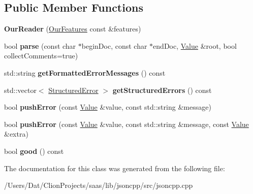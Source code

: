 \subsection*{Public Member Functions}
\begin{DoxyCompactItemize}
\item 
{\bfseries Our\+Reader} (\hyperlink{class_json_1_1_our_features}{Our\+Features} const \&features)\hypertarget{class_json_1_1_our_reader_a48a850914b9c8d7781be172930c478e5}{}\label{class_json_1_1_our_reader_a48a850914b9c8d7781be172930c478e5}

\item 
bool {\bfseries parse} (const char $\ast$begin\+Doc, const char $\ast$end\+Doc, \hyperlink{class_json_1_1_value}{Value} \&root, bool collect\+Comments=true)\hypertarget{class_json_1_1_our_reader_aba4f8749aab7f02ec17f107e392caf80}{}\label{class_json_1_1_our_reader_aba4f8749aab7f02ec17f107e392caf80}

\item 
std\+::string {\bfseries get\+Formatted\+Error\+Messages} () const \hypertarget{class_json_1_1_our_reader_ae9cbb7dbd9c6c96be37432e8dfa1afcb}{}\label{class_json_1_1_our_reader_ae9cbb7dbd9c6c96be37432e8dfa1afcb}

\item 
std\+::vector$<$ \hyperlink{struct_json_1_1_our_reader_1_1_structured_error}{Structured\+Error} $>$ {\bfseries get\+Structured\+Errors} () const \hypertarget{class_json_1_1_our_reader_a02ef7871af3706754a233c36e6d489e9}{}\label{class_json_1_1_our_reader_a02ef7871af3706754a233c36e6d489e9}

\item 
bool {\bfseries push\+Error} (const \hyperlink{class_json_1_1_value}{Value} \&value, const std\+::string \&message)\hypertarget{class_json_1_1_our_reader_aef7aa4ca22ffaa38c401b16951d20e1e}{}\label{class_json_1_1_our_reader_aef7aa4ca22ffaa38c401b16951d20e1e}

\item 
bool {\bfseries push\+Error} (const \hyperlink{class_json_1_1_value}{Value} \&value, const std\+::string \&message, const \hyperlink{class_json_1_1_value}{Value} \&extra)\hypertarget{class_json_1_1_our_reader_ad43315cbb0d6804e3b7177e84a1ec53d}{}\label{class_json_1_1_our_reader_ad43315cbb0d6804e3b7177e84a1ec53d}

\item 
bool {\bfseries good} () const \hypertarget{class_json_1_1_our_reader_a048346238d703ad9aed06beb686e6102}{}\label{class_json_1_1_our_reader_a048346238d703ad9aed06beb686e6102}

\end{DoxyCompactItemize}


The documentation for this class was generated from the following file\+:\begin{DoxyCompactItemize}
\item 
/\+Users/\+Dat/\+Clion\+Projects/saas/lib/jsoncpp/src/jsoncpp.\+cpp\end{DoxyCompactItemize}
